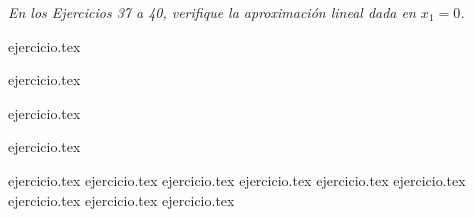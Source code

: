 \noindent \textit{En los Ejercicios 37 a 40, verifique la aproximación lineal dada en $x_1 = 0$.}

\begin{enumerate}
    \begin{minipage}{0.45\textwidth}
    \setcounter{enumi}{36}
    {ejercicio.tex}
    \addtocounter{enumi}{1}
    {ejercicio.tex}
    \end{minipage}%
    \begin{minipage}{0.45\textwidth}
    \setcounter{enumi}{37}
    {ejercicio.tex}
    \addtocounter{enumi}{1}
    {ejercicio.tex}
    \end{minipage}
\end{enumerate}

\begin{enumerate}
    \setcounter{enumi}{40}
    {ejercicio.tex}
    {ejercicio.tex}
    {ejercicio.tex}
    {ejercicio.tex}
    {ejercicio.tex}
    {ejercicio.tex}
    {ejercicio.tex}
    {ejercicio.tex}
    {ejercicio.tex}
\end{enumerate}
